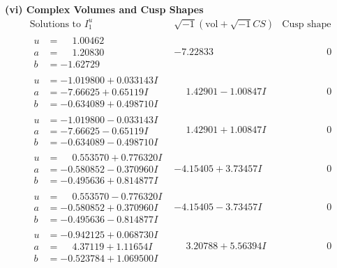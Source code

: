 \documentclass[1p]{elsarticle_modified}
\theoremstyle{definition}
\newcommand{\I}{\sqrt{-1}}
\begin{document}
\newpage\flushleft \textbf{(vi) Complex Volumes and Cusp Shapes}
$$\begin{array}{c|c|c}  
\text{Solutions to }I^u_{1}& \I (\text{vol} + \sqrt{-1}CS) & \text{Cusp shape}\\
 \hline 
\begin{aligned}
u &= \phantom{-}1.00462\phantom{ +0.000000I} \\
a &= \phantom{-}1.20830\phantom{ +0.000000I} \\
b &= -1.62729\phantom{ +0.000000I}\end{aligned}
 & -7.22833\phantom{ +0.000000I} & \phantom{-0.000000 } 0 \\ \hline\begin{aligned}
u &= -1.019800 + 0.033143 I \\
a &= -7.66625 + 0.65119 I \\
b &= -0.634089 + 0.498710 I\end{aligned}
 & \phantom{-}1.42901 - 1.00847 I & \phantom{-0.000000 } 0 \\ \hline\begin{aligned}
u &= -1.019800 - 0.033143 I \\
a &= -7.66625 - 0.65119 I \\
b &= -0.634089 - 0.498710 I\end{aligned}
 & \phantom{-}1.42901 + 1.00847 I & \phantom{-0.000000 } 0 \\ \hline\begin{aligned}
u &= \phantom{-}0.553570 + 0.776320 I \\
a &= -0.580852 - 0.370960 I \\
b &= -0.495636 + 0.814877 I\end{aligned}
 & -4.15405 + 3.73457 I & \phantom{-0.000000 } 0 \\ \hline\begin{aligned}
u &= \phantom{-}0.553570 - 0.776320 I \\
a &= -0.580852 + 0.370960 I \\
b &= -0.495636 - 0.814877 I\end{aligned}
 & -4.15405 - 3.73457 I & \phantom{-0.000000 } 0 \\ \hline\begin{aligned}
u &= -0.942125 + 0.068730 I \\
a &= \phantom{-}4.37119 + 1.11654 I \\
b &= -0.523784 + 1.069500 I\end{aligned}
 & \phantom{-}3.20788 + 5.56394 I & \phantom{-0.000000 } 0 \\ \hline\begin{aligned}

\end{aligned}
\end{array}$$
\end{document}
